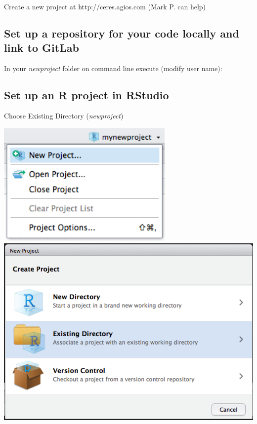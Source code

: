\documentclass[]{book}
\begin{document}
Create a new project at http://ceres.agios.com (Mark P. can help)

\hypertarget{set-up-a-repository-for-your-code-locally-and-link-to-gitlab}{%
\subsection{Set up a repository for your code locally and link to GitLab}\label{set-up-a-repository-for-your-code-locally-and-link-to-gitlab}}

In your \emph{newproject} folder on command line execute (modify user name):

\hypertarget{set-up-an-r-project-in-rstudio}{%
\subsection{Set up an R project in RStudio}\label{set-up-an-r-project-in-rstudio}}

Choose Existing Directory (\emph{newproject})

\includegraphics[width=3.39in]{images/newproject0}
\includegraphics[width=7.49in]{images/newproject}
\end{document}
